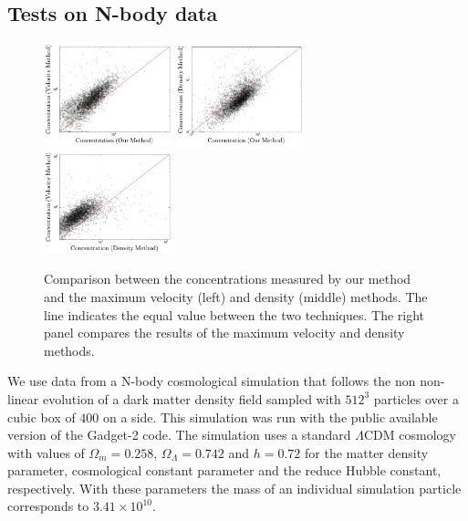 \documentclass{emulateapj}
\newcommand{\hMpc}{{\ifmmode{h^{-1}{\rm Mpc}}\else{$h^{-1}$Mpc }\fi}}
\newcommand{\hMsun}{{\ifmmode{h^{-1}{\rm
        {M_{\odot}}}}\else{$h^{-1}{\rm{M_{\odot}}}$}\fi}}
\begin{document}
\subsection{Tests on N-body data}
\label{sec:data}
\begin{figure}
  \begin{center}
    \includegraphics[width=0.33\textwidth]{mass-velocity.pdf}
    \includegraphics[width=0.33\textwidth]{mass-density.pdf}
    \includegraphics[width=0.33\textwidth]{density-velocity.pdf}
  \end{center}
  \caption{Comparison between the concentrations measured by our
    method and the maximum velocity (left) and density (middle)
    methods. The line indicates the equal value between the two
    techniques. The right panel compares the results of the maximum
    velocity and density methods.
  \label{fig:mdv}}
\end{figure}

We use data from a N-body cosmological simulation that follows the non
non-linear evolution of a dark matter density field sampled with
$512^3$ particles over a cubic box of $400$ \hMpc on a side. 
This simulation was run with the public available version of the
Gadget-2 code. 
The simulation uses a standard $\Lambda$CDM cosmology with values of
$\Omega_m=0.258$, $\Omega_\Lambda=0.742$ and $h=0.72$ for the matter
density parameter, cosmological constant parameter and the reduce
Hubble constant, respectively. 
With these parameters the mass of an individual simulation particle
corresponds to $3.41\times 10^{10}$\hMsun.
\end{document}
